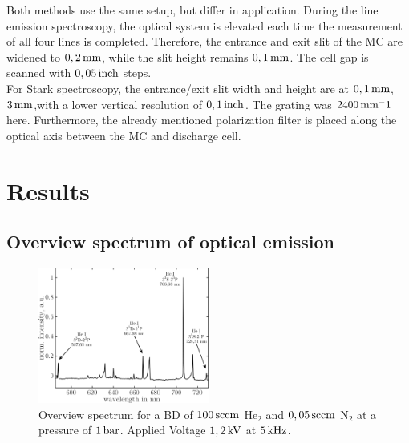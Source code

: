 \documentclass[a4paper,10pt,twoside]{article}
\begin{document}
			Both methods use the same setup, but differ in application. During the line emission spectroscopy, the optical system is elevated each time the measurement of all four lines is completed. Therefore, the entrance and exit slit of the MC are widened to $\unit[0,2]{mm}$, while the slit height remains $\unit[0,1]{mm}$. The cell gap is scanned with $\unit[0,05]{inch}$ steps.\\
			For Stark spectroscopy, the entrance/exit slit width and height are at $\unit[0,1]{mm}$, $\unit[3]{mm}$,with a lower vertical resolution of $\unit[0,1]{inch}$. The grating was $\unit[2400]{mm^-1}$ here. Furthermore, the already mentioned polarization filter is placed along the optical axis between the MC and discharge cell.

	\section{Results}

		\subsection{Overview spectrum of optical emission}\label{subsec:overview}
			
				\begin{figure}
					\centering
					\includegraphics[width=0.5\textwidth]{figures/results/int_spectrum}
					\caption{Overview spectrum for a BD of $\unit[100]{sccm}$ He$_2$ and $\unit[0,05]{sccm}$ N$_2$ at a pressure of $\unit[1]{bar}$. Applied Voltage $\unit[1,2]{kV}$ at $\unit[5]{kHz}$.}
					\label{img:intspec}
				\end{figure}
		
\end{document}
